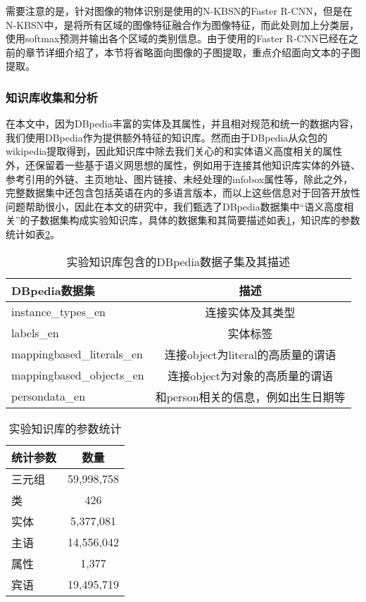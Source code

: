 需要注意的是，针对图像的物体识别是使用的N-KBSN的Faster R-CNN，但是在N-KBSN中，是将所有区域的图像特征融合作为图像特征，而此处则加上分类层，使用softmax预测并输出各个区域的类别信息。由于使用的Faster R-CNN已经在之前的章节详细介绍了，本节将省略面向图像的子图提取，重点介绍面向文本的子图提取。

\subsubsection{知识库收集和分析}
在本文中，因为DBpedia丰富的实体及其属性，并且相对规范和统一的数据内容，我们使用DBpedia作为提供额外特征的知识库。然而由于DBpedia从众包的wikipedia提取得到，因此知识库中除去我们关心的和实体语义高度相关的属性外，还保留着一些基于语义网思想的属性，例如用于连接其他知识库实体的外链、参考引用的外链、主页地址、图片链接、未经处理的infobox属性等，除此之外，完整数据集中还包含包括英语在内的多语言版本，而以上这些信息对于回答开放性问题帮助很小，因此在本文的研究中，我们甄选了DBpedia数据集中“语义高度相关”的子数据集构成实验知识库，具体的数据集和其简要描述如表\ref{dbpeidaList}，知识库的参数统计如表\ref{dbpediaPara}。
\begin{table}[H]
\centering
\caption{实验知识库包含的DBpedia数据子集及其描述}
\begin{tabular*}{0.9\textwidth}{lc}
\toprule
\textbf{DBpedia数据集} & \textbf{描述}\\
\midrule
instance\_types\_en & 连接实体及其类型 \\
labels\_en & 实体标签 \\
mappingbased\_literals\_en & 连接object为literal的高质量的谓语 \\
mappingbased\_objects\_en & 连接object为对象的高质量的谓语 \\
persondata\_en & 和person相关的信息，例如出生日期等 \\
\bottomrule
\end{tabular*}
\label{dbpeidaList}
\end{table}
\begin{table}[H]
\centering
\caption{实验知识库的参数统计}
\begin{tabular}{lc}
\toprule
\textbf{统计参数} & \textbf{数量}\\
\midrule
三元组 &  59,998,758\\
类 &  426\\
实体 & 5,377,081 \\
主语 & 14,556,042 \\
属性 & 1,377 \\
宾语 & 19,495,719 \\
\bottomrule
\end{tabular}
\label{dbpediaPara}
\end{table}

